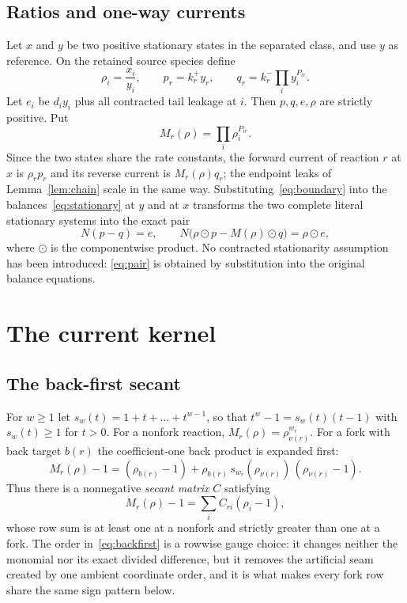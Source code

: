 \documentclass[11pt,reqno]{amsart}
\theoremstyle{plain}
\theoremstyle{definition}
\theoremstyle{remark}
\numberwithin{equation}{section}
\begin{document}
\subsection{Ratios and one-way currents}\label{subsec:ratios}
Let $x$ and $y$ be two positive stationary states in the separated class, and use $y$ as reference.  On the retained source species define
\begin{equation}\label{eq:rho-pq}
\rho_i=\frac{x_i}{y_i},\qquad p_r=k_r^+y_r,\qquad q_r=k_r^-\prod_iy_i^{P_{ir}} .
\end{equation}
Let $e_i$ be $d_iy_i$ plus all contracted tail leakage at $i$.  Then $p,q,e,\rho$ are strictly positive.  Put
\begin{equation}\label{eq:M}
M_r(\rho)=\prod_i\rho_i^{P_{ir}} .
\end{equation}
Since the two states share the rate constants, the forward current of reaction $r$ at $x$ is $\rho_rp_r$ and its reverse current is $M_r(\rho)q_r$; the endpoint leaks of Lemma~\ref{lem:chain} scale in the same way.  Substituting~\eqref{eq:boundary} into the balances~\eqref{eq:stationary} at $y$ and at $x$ transforms the two complete literal stationary systems into the exact pair
\begin{equation}\label{eq:pair}
N(p-q)=e,\qquad N\bigl(\rho\odot p-M(\rho)\odot q\bigr)=\rho\odot e,
\end{equation}
where $\odot$ is the componentwise product.  No contracted stationarity assumption has been introduced: \eqref{eq:pair} is obtained by substitution into the original balance equations.

\section{The current kernel}\label{sec:kernel}

\subsection{The back-first secant}\label{subsec:secant}
For $w\ge1$ let $s_w(t)=1+t+\dots+t^{w-1}$, so that $t^w-1=s_w(t)(t-1)$ with $s_w(t)\ge1$ for $t>0$.  For a nonfork reaction, $M_r(\rho)=\rho_{\nu(r)}^{w_r}$.  For a fork with back target $b(r)$ the coefficient-one back product is expanded first:
\begin{equation}\label{eq:backfirst}
M_r(\rho)-1=(\rho_{b(r)}-1)+\rho_{b(r)}\,s_{w_r}(\rho_{\nu(r)})\,(\rho_{\nu(r)}-1).
\end{equation}
Thus there is a nonnegative \emph{secant matrix} $C$ satisfying
\begin{equation}\label{eq:secant}
M_r(\rho)-1=\sum_iC_{ri}(\rho_i-1),
\end{equation}
whose row sum is at least one at a nonfork and strictly greater than one at a fork.  The order in~\eqref{eq:backfirst} is a rowwise gauge choice: it changes neither the monomial nor its exact divided difference, but it removes the artificial seam created by one ambient coordinate order, and it is what makes every fork row share the same sign pattern below.
\end{document}
